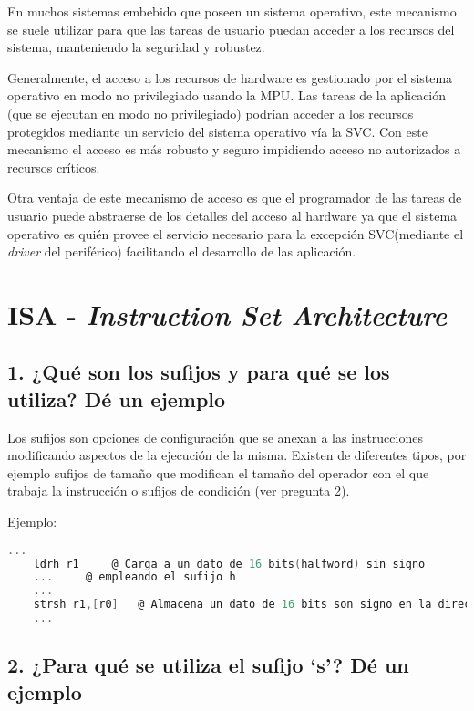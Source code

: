 \documentclass[10pt,a4paper,twoside,spanish]{article}	%
\begin{document}
En muchos sistemas embebido que poseen un sistema operativo, este mecanismo se suele utilizar para que las tareas de usuario puedan acceder a los recursos del sistema, manteniendo la seguridad y robustez.

Generalmente, el acceso a los recursos de hardware es gestionado por el sistema operativo en modo no privilegiado usando la MPU. Las tareas de la aplicación (que se ejecutan en modo no privilegiado) podrían acceder a los recursos protegidos mediante un servicio del sistema operativo vía la SVC. Con este mecanismo el acceso es más robusto y seguro impidiendo acceso no autorizados a recursos críticos.  


Otra ventaja de este mecanismo de acceso es que el programador de las tareas de usuario puede abstraerse de los detalles del acceso al hardware ya que el sistema operativo es quién provee el servicio necesario para la excepción SVC(mediante el \textit{driver} del periférico) facilitando el desarrollo de las aplicación.

 
\section*{ISA - \textit{Instruction Set Architecture}}

\subsection*{1. ¿Qué son los sufijos y para qué se los utiliza? Dé un ejemplo}

Los sufijos son opciones de configuración que se anexan a las instrucciones modificando aspectos de la ejecución de la misma. Existen de diferentes tipos, por ejemplo sufijos de tamaño que modifican el tamaño del operador con el que trabaja la instrucción o sufijos de condición (ver pregunta 2).

Ejemplo:
\begin{lstlisting}[language=C]
	...
	ldrh r1		@ Carga a un dato de 16 bits(halfword) sin signo 
	...		@ empleando el sufijo h 
	...
	strsh r1,[r0]	@ Almacena un dato de 16 bits son signo en la direccion r0	
	...
\end{lstlisting}




\subsection*{2. ¿Para qué se utiliza el sufijo ‘s’? Dé un ejemplo}
\end{document}
